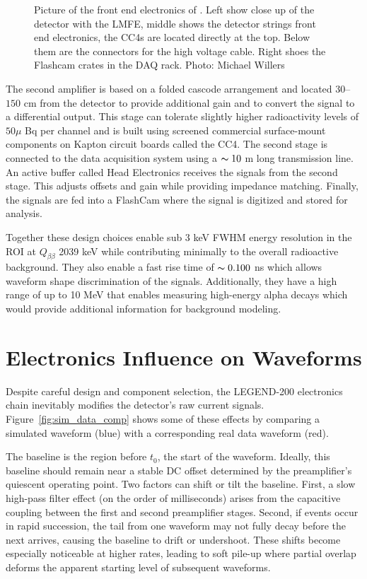 \begin{figure}[!htb]
    \caption{Picture of the front end electronics of {\Ltwo}. Left show close up of the detector with the LMFE, middle shows the detector strings front end electronics, the CC4s are located directly at the top. Below them are the connectors for the high voltage cable. Right shoes the Flashcam crates in the DAQ rack. Photo: Michael Willers}
   \label{ch6_fig_l200_elec_model_real}
\end{figure}


The second amplifier is based on a folded cascode arrangement and located $30$–$150$ cm from the detector to provide additional gain and to convert the signal to a differential output. This stage can tolerate slightly higher radioactivity levels of $50\mu$ Bq per channel and is built using screened commercial surface-mount components on Kapton circuit boards called the CC4. The second stage is connected to the data acquisition system using a $\thicksim 10$ m long transmission line. An active buffer called Head Electronics receives the signals from the second stage. This adjusts offsets and gain while providing impedance matching. Finally, the signals are fed into a FlashCam where the signal is digitized and stored for analysis.

Together these design choices enable sub 3 keV FWHM energy resolution in the ROI at $Q_{\beta\beta}$ 2039 keV while contributing minimally to the overall radioactive background. They also enable a fast rise time of $\thicksim 0.100$ ns which allows waveform shape discrimination of the signals. Additionally, they have a high range of up to 10 MeV that enables measuring high-energy alpha decays which would provide additional information for background modeling.

\section{Electronics Influence on Waveforms}

Despite careful design and component selection, the LEGEND-200 electronics chain inevitably modifies the detector’s raw current signals. Figure~\ref{fig:sim_data_comp} shows some of these effects by comparing a simulated waveform (blue) with a corresponding real data waveform (red).

The baseline is the region before $t_0$, the start of the waveform. Ideally, this baseline should remain near a stable DC offset determined by the preamplifier’s quiescent operating point. Two factors can shift or tilt the baseline. First, a slow high-pass filter effect (on the order of milliseconds) arises from the capacitive coupling between the first and second preamplifier stages. Second, if events occur in rapid succession, the tail from one waveform may not fully decay before the next arrives, causing the baseline to drift or undershoot. These shifts become especially noticeable at higher rates, leading to soft pile-up where partial overlap deforms the apparent starting level of subsequent waveforms. 

